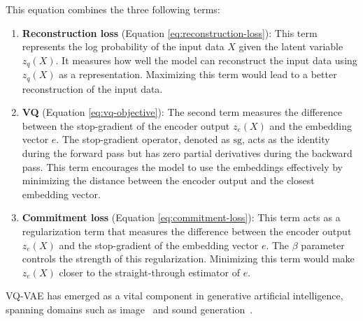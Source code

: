 This equation combines the three following terms:
\begin{enumerate}
	\item \textbf{Reconstruction loss} (Equation \ref{eq:reconstruction-loss}): This term represents the log probability of the input data $X$ given the latent variable  $z_q(X)$. It measures how well the model can reconstruct the input data using $z_q(X)$ as a representation. Maximizing this term would lead to a better reconstruction of the input data.
	\item \textbf{\Ac{VQ}} (Equation \ref{eq:vq-objective}): The second term measures the difference between the stop-gradient of the encoder output $z_e(X)$ and the embedding vector $e$. The stop-gradient operator, denoted as $\text{sg}$, acts as the identity during the forward pass but has zero partial derivatives during the backward pass. This term encourages the model to use the embeddings effectively by minimizing the distance between the encoder output and the closest embedding vector.
	\item \textbf{Commitment loss} (Equation \ref{eq:commitment-loss}): This term acts as a regularization term that measures the difference between the encoder output $z_e(X)$ and the stop-gradient of the embedding vector $e$. The  $\beta$ parameter controls the strength of this regularization. Minimizing this term would make $z_e(X)$  closer to the straight-through estimator of $e$.
\end{enumerate}

VQ-VAE has emerged as a vital component in generative artificial intelligence, spanning domains such as image~\cite{ramesh_zero-shot_2021} and sound generation~\cite{yang_diffsound_2022}.